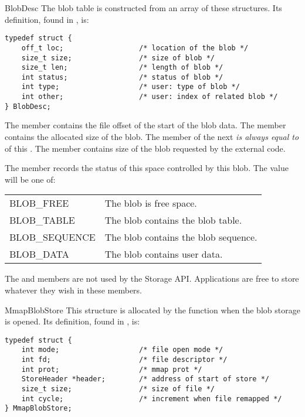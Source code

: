 \begin{ctypedesc}[BlobDesc]{BlobDesc}
The blob table is constructed from an array of these structures.  Its
definition, found in , is:

\begin{verbatim}
typedef struct {
    off_t loc;                  /* location of the blob */
    size_t size;                /* size of blob */
    size_t len;                 /* length of blob */
    int status;                 /* status of blob */
    int type;                   /* user: type of blob */
    int other;                  /* user: index of related blob */
} BlobDesc;
\end{verbatim}

The  member contains the file offset of the start of the
blob data.  The  member contains the allocated size of the
blob.  The  member of the next  \emph{is
always equal to}  of this .  The
 member contains size of the blob requested by the external
code.

The  member records the status of this space controlled
by this blob.  The value will be one of:

\begin{longtable}{l|l}
BLOB_FREE & The blob is free space. \\
BLOB_TABLE & The blob contains the blob table. \\
BLOB_SEQUENCE & The blob contains the blob sequence. \\
BLOB_DATA & The blob contains user data. \\
\end{longtable}

The  and  members are not used by the Storage
API.  Applications are free to store whatever they wish in these
members.
\end{ctypedesc}

\begin{ctypedesc}[MmapBlobStore]{MmapBlobStore}
This structure is allocated by the  function
when the blob storage is opened.  Its definition, found in
, is:

\begin{verbatim}
typedef struct {
    int mode;                   /* file open mode */
    int fd;                     /* file descriptor */
    int prot;                   /* mmap prot */
    StoreHeader *header;        /* address of start of store */
    size_t size;                /* size of file */
    int cycle;                  /* increment when file remapped */
} MmapBlobStore;
\end{verbatim}
\end{ctypedesc}

